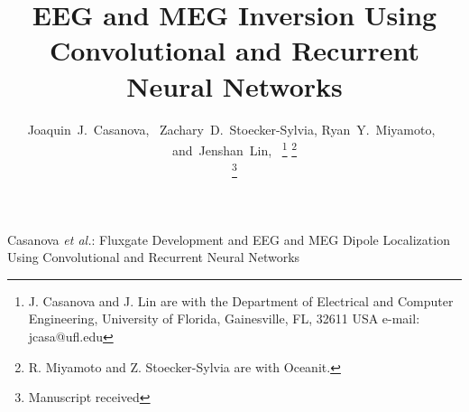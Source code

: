 \documentclass[journal,12pt,onecolumn,draftclsnofoot]{IEEEtran}
\begin{document}

\title{EEG and MEG Inversion Using Convolutional and Recurrent Neural Networks}


\author{Joaquin~J.~Casanova,~
        Zachary~D.~Stoecker-Sylvia,
        Ryan~Y.~Miyamoto,~
        and~Jenshan~Lin,~%
\thanks{J. Casanova and J. Lin are with the Department
of Electrical and Computer Engineering, University of Florida, Gainesville,
FL, 32611 USA e-mail: jcasa@ufl.edu}%
\thanks{R. Miyamoto and Z. Stoecker-Sylvia are with Oceanit.}%

\thanks{Manuscript received }}

%
{Casanova \MakeLowercase{\textit{et al.}}: Fluxgate Development and EEG and MEG Dipole Localization Using Convolutional and Recurrent Neural Networks}
\maketitle
\end{document}

